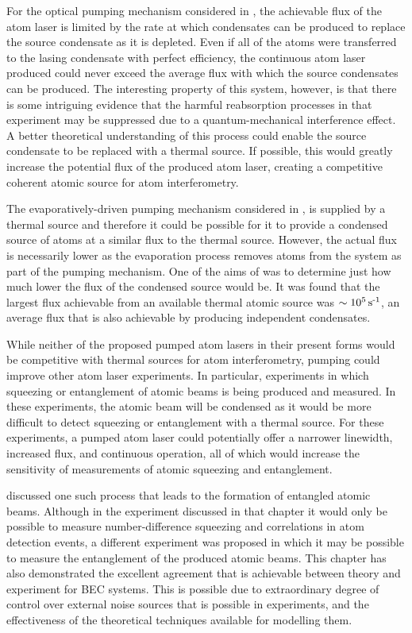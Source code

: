 For the optical pumping mechanism considered in , the achievable flux of the atom laser is limited by the rate at which condensates can be produced to replace the source condensate as it is depleted.  Even if all of the atoms were transferred to the lasing condensate with perfect efficiency, the continuous atom laser produced could never exceed the average flux with which the source condensates can be produced.  The interesting property of this system, however, is that there is some intriguing evidence that the harmful reabsorption processes in that experiment may be suppressed due to a quantum-mechanical interference effect.  A better theoretical understanding of this process could enable the source condensate to be replaced with a thermal source.  If possible, this would greatly increase the potential flux of the produced atom laser, creating a competitive coherent atomic source for atom interferometry.

The evaporatively-driven pumping mechanism considered in , is supplied by a thermal source and therefore it could be possible for it to provide a condensed source of atoms at a similar flux to the thermal source.  However, the actual flux is necessarily lower as the evaporation process removes atoms from the system as part of the pumping mechanism.  One of the aims of  was to determine just how much lower the flux of the condensed source would be.  It was found that the largest flux achievable from an available thermal atomic source was $\sim\unit[10^5]{s\textsuperscript{-1}}$, an average flux that is also achievable by producing independent condensates.

While neither of the proposed pumped atom lasers in their present forms would be competitive with thermal sources for atom interferometry, pumping could improve other atom laser experiments.  In particular, experiments in which squeezing or entanglement of atomic beams is being produced and measured.  In these experiments, the atomic beam will be condensed as it would be more difficult to detect squeezing or entanglement with a thermal source.  For these experiments, a pumped atom laser could potentially offer a narrower linewidth, increased flux, and continuous operation, all of which would increase the sensitivity of measurements of atomic squeezing and entanglement.

 discussed one such process that leads to the formation of entangled atomic beams.  Although in the experiment discussed in that chapter it would only be possible to measure number-difference squeezing and correlations in atom detection events, a different experiment was proposed in which it may be possible to measure the entanglement of the produced atomic beams.  This chapter has also demonstrated the excellent agreement that is achievable between theory and experiment for BEC systems.  This is possible due to extraordinary degree of control over external noise sources that is possible in experiments, and the effectiveness of the theoretical techniques available for modelling them.

